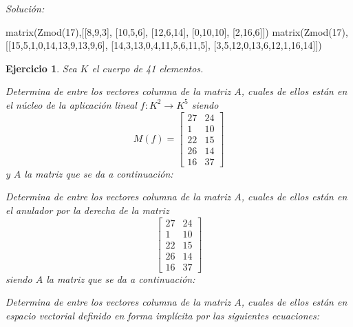 \documentclass[12pt]{amsart}
\newtheorem{ejer}{Ejercicio}
\begin{document}
{\it Soluci\'on:}

\begin{sageblock}
matrix(Zmod(17),[[8,9,3],
[10,5,6],
[12,6,14],
[0,10,10],
[2,16,6]])
matrix(Zmod(17),[[15,5,1,0,14,13,9,13,9,6],
[14,3,13,0,4,11,5,6,11,5],
[3,5,12,0,13,6,12,1,16,14]])
\end{sageblock}



\begin{ejer} Sea $K$ el cuerpo de 41 elementos.
\newline
\noindent\begin{minipage}{\textwidth}
\begin{tcolorbox}[colback = green!20!white,title=Versión Núcleo]
Determina de entre los vectores columna de la matriz $A$, cuales de ellos están en el núcleo de la aplicación lineal $f:K^{2} \to K^{5}$ siendo  $$ M(f) = \left[\begin{array}{rr}
27 & 24 \\
1 & 10 \\
22 & 15 \\
26 & 14 \\
16 & 37
\end{array}\right] $$ y $A$ la matriz que se da a continuación:\end{tcolorbox}
\end{minipage} \newline
\noindent\begin{minipage}{\textwidth}
\begin{tcolorbox}[colback = blue!20!white,title=Versión Anulador]
Determina de entre los vectores columna de la matriz $A$, cuales de ellos están en el anulador por la derecha de la matriz $$ \left[\begin{array}{rr}
27 & 24 \\
1 & 10 \\
22 & 15 \\
26 & 14 \\
16 & 37
\end{array}\right] $$ siendo $A$ la matriz que se da a continuación:\end{tcolorbox}
\end{minipage} \newline
\noindent\begin{minipage}{\textwidth} 
\begin{tcolorbox}[colback = red!20!white,title=Versión Ecuaciones Implícitas]
Determina de entre los vectores columna de la matriz $A$, cuales de ellos están en espacio vectorial definido en forma implícita por las siguientes ecuaciones:

\end{tcolorbox}
\end{minipage}
\end{ejer}
\end{document}
